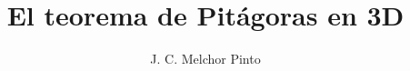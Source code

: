 \documentclass[12pt]{guia}
\title{El teorema de Pitágoras en 3D}
\author{J. C. Melchor Pinto}
\begin{document}
\pagestyle{headandfoot}
\addpoints
\INFO
\printanswers
\vspace{-0.5cm}
\begin{multicols}{2}
    
    
    \columnbreak
    
\end{multicols}
\begin{questions}
    \questionboxed[10]{}
    \questionboxed[10]{}
    \questionboxed[10]{}
    \questionboxed[10]{}
    \questionboxed[10]{}
    \questionboxed[10]{}
    \questionboxed[10]{}
    \questionboxed[10]{}
    \questionboxed[10]{}
    \questionboxed[10]{}
\end{questions}
\end{document}
